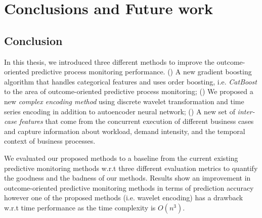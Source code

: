 
\chapter{Conclusions and Future work} \label{ch6} %



\ifpdf
    \graphicspath{{X/figures/PNG/}{X/figures/PDF/}{X/figures/}}
\else
    \graphicspath{{X/figures/EPS/}{X/figures/}}
\fi

\section{Conclusion} 
In this thesis, we introduced three different methods to improve the outcome-oriented predictive process monitoring performance. () A new gradient boosting algorithm that handles categorical features and uses order boosting, i.e. \textit{CatBoost} to the area of outcome-oriented predictive process monitoring; () We proposed a new \textit{complex encoding method} using discrete wavelet transformation and time series encoding in addition to autoencoder neural network; () A new set of \textit{inter-case features} that come from the concurrent execution of different business cases and capture information about workload, demand intensity, and the temporal context of business processes. 

We evaluated our proposed methods to a baseline from the current existing predictive monitoring methods w.r.t three different evaluation metrics to quantify the goodness and the badness of our methods.  Results show an improvement in outcome-oriented predictive monitoring methods in terms of prediction accuracy however one of the proposed methods (i.e. wavelet encoding) has a drawback w.r.t time performance as the time complexity is $O(n^3)$. 

